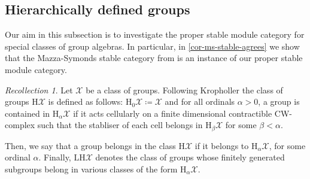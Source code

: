 \documentclass{amsart}
\DeclareMathOperator{\Mod}{Mod}
\DeclareMathOperator{\Cof}{Cof}
\numberwithin{equation}{section}%
\theoremstyle{remark}
\newtheorem{remark}[equation]{Remark}
\newtheorem{recollection}[equation]{Recollection}
\begin{document}
{%




\subsection{Hierarchically defined groups}\label{subsec-hiera}

Our aim in this subsection is to investigate the proper stable module category for special classes of group algebras. In particular, in \cref{cor-ms-stable-agrees} we show that the Mazza-Symonds stable category from \cite{MS19} is an instance of our proper stable module category.

 \begin{recollection}\label{rec-krop}
     Let $\mathcal{X}$ be a class of groups. Following Kropholler \cite{Krop} the class of groups $\mathrm{H}\mathcal{X}$ is defined as follows: $\mathrm{H}_0\mathcal{X}\coloneqq \mathcal{X}$ and for all ordinals $\alpha > 0$, a group is contained in $\mathrm{H}_{\alpha}\mathcal{X}$ if it acts cellularly on a finite dimensional contractible CW-complex such that the stabliser of each cell belongs in $\mathrm{H}_{\beta}\mathcal{X}$ for some $\beta < \alpha$. 
     
Then, we say that a group belongs in the class $\mathrm{H}\mathcal{X}$ if it belongs to $\mathrm{H}_{\alpha}\mathcal{X}$, for some ordinal $\alpha$. Finally, $\mathrm{LH}\mathcal{X}$ denotes the class of groups whose finitely generated subgroups belong in various classes of the form $\mathrm{H}_{\alpha}\mathcal{X}$.
 \end{recollection}

}
\end{document}
